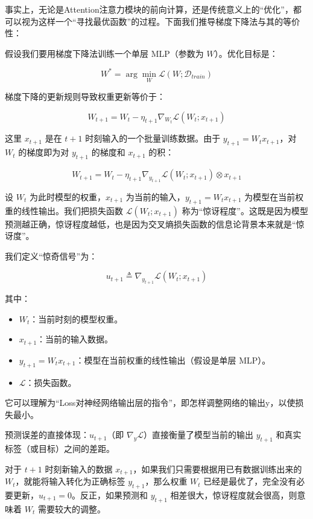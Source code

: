 事实上，无论是Attention注意力模块的前向计算，还是传统意义上的``优化''，都可以视为这样一个``寻找最优函数''的过程。下面我们推导梯度下降法与其的等价性：

假设我们要用梯度下降法训练一个单层 MLP（参数为 \(W\)）。优化目标是：

\[
W^*=\arg\min_W\mathcal{L}(W;\mathcal{D}_{train})
\]

梯度下降的更新规则导致权重更新等价于：

\[
W_{t+1}=W_t-\eta_{t+1}\nabla_{W_t}\mathcal{L}(W_t;x_{t+1})
\]

这里 \(x_{t+1}\) 是在 \(t+1\) 时刻输入的一个批量训练数据。由于 \(y_{t+1}=W_tx_{t+1}\)，对 \(W_t\) 的梯度即为对 \(y_{t+1}\) 的梯度和 \(x_{t+1}\) 的积：

\[
W_{t+1}=W_t-\eta_{t+1}\nabla_{y_{t+1}}\mathcal{L}(W_t;x_{t+1})\otimes x_{t+1}
\tag{4}
\]

设 \(W_t\) 为此时模型的权重，\(x_{t+1}\) 为当前的输入，\(y_{t+1}=W_tx_{t+1}\) 为模型在当前权重的线性输出。我们把损失函数 \(\mathcal{L}(W_t;x_{t+1})\) 称为``惊讶程度''。这既是因为模型预测越正确，惊讶程度越低，也是因为交叉熵损失函数的信息论背景本来就是``惊讶度''。

我们定义``惊奇信号''为：

\[
u_{t+1}\triangleq \nabla_{y_{t+1}}\mathcal{L}(W_t;x_{t+1})
\]

其中：

\begin{itemize}
\tightlist
\item
  \(W_t\)：当前时刻的模型权重。
\item
  \(x_{t+1}\)：当前的输入数据。
\item
  \(y_{t+1}=W_tx_{t+1}\)：模型在当前权重的线性输出（假设是单层 MLP）。
\item
  \(\mathcal{L}\)：损失函数。
\end{itemize}

它可以理解为``Loss对神经网络输出层的指令''，即怎样调整网络的输出y，以使损失最小。

预测误差的直接体现：\(u_{t+1}\)（即 \(\nabla_y\mathcal{L}\)）直接衡量了模型当前的输出 \(y_{t+1}\) 和真实标签（或目标）之间的差距。

对于 \(t+1\) 时刻新输入的数据 \(x_{t+1}\)，如果我们只需要根据用已有数据训练出来的 \(W_t\)，就能将输入转化为正确标签 \(y_{t+1}\)，那么权重 \(W_t\) 已经是最优了，完全没有必要更新，\(u_{t+1}=0\)。反正，如果预测和 \(y_{t+1}\) 相差很大，惊讶程度就会很高，则意味着 \(W_t\) 需要较大的调整。

